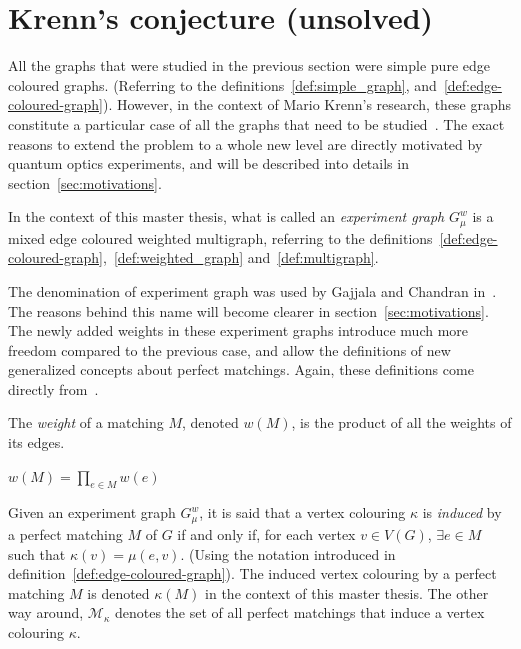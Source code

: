 \section{Krenn's conjecture (unsolved)}
\label{sec:krenn_conjecture}

All the graphs that were studied in the previous section were simple pure edge coloured graphs.
(Referring to the definitions~\ref{def:simple_graph}, and~\ref{def:edge-coloured-graph}).
However, in the context of Mario Krenn's research, these graphs constitute a particular case of all the graphs that need to be studied~\cite{Krenn_2017,wordpress}.
The exact reasons to extend the problem to a whole new level are directly motivated by quantum optics experiments, and will be described into details in section~\ref{sec:motivations}.

\begin{definition}
    \label{def:experiment_graph}
    In the context of this master thesis, what is called an \textit{experiment graph} $G_\mu^w$ is a mixed edge coloured weighted multigraph, referring to the definitions~\ref{def:edge-coloured-graph},~\ref{def:weighted_graph} and~\ref{def:multigraph}.
\end{definition}

The denomination of experiment graph was used by Gajjala and Chandran in~\cite{chandran2023graphtheoretic}.
The reasons behind this name will become clearer in section~\ref{sec:motivations}.
The newly added weights in these experiment graphs introduce much more freedom compared to the previous case, and allow the definitions of new generalized concepts about perfect matchings.
Again, these definitions come directly from~\cite{wordpress}.

\begin{definition}
    \label{def:matching_weight}
    The \textit{weight} of a matching $M$, denoted $w(M)$, is the product of all the weights of its edges.
    \begin{center}
        $w(M) = \prod\limits_{e \in M}w(e)$
    \end{center}
\end{definition}

\begin{definition}
    \label{def:induced_vertex_colouring}
    Given an experiment graph $G_\mu^w$, it is said that a vertex colouring $\kappa$ is \textit{induced} by a perfect matching $M$ of $G$ if and only if, for each vertex $v \in V(G)$, $\exists e \in M$ such that $\kappa(v) = \mu(e, v)$.
    (Using the notation introduced in definition~\ref{def:edge-coloured-graph}).
    The induced vertex colouring by a perfect matching $M$ is denoted $\kappa(M)$ in the context of this master thesis.
    The other way around, $\mathcal{M}_\kappa$ denotes the set of all perfect matchings that induce a vertex colouring $\kappa$.
\end{definition}

